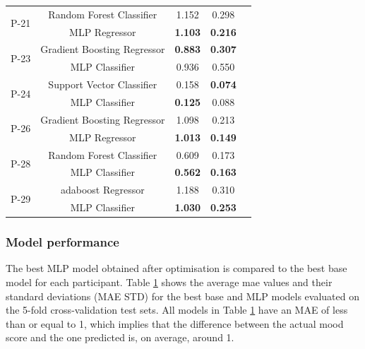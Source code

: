 \begin{table}[htbp]
\begin{tabular}{ccc c c}
 \multirow{2}{*}{P-21} 
 & Random Forest Classifier    & 1.152 & 0.298 \\
 & MLP Regressor               & \textbf{1.103} & \textbf{0.216} \\
 \hline

 \multirow{2}{*}{P-23} 
 & Gradient Boosting Regressor & \textbf{0.883} & \textbf{0.307} \\
 & MLP Classifier              & 0.936 & 0.550 \\
 \hline

 \multirow{2}{*}{P-24} 
 & Support Vector Classifier   & 0.158 & \textbf{0.074} \\
 & MLP Classifier              & \textbf{0.125} & 0.088 \\
 \hline

 \multirow{2}{*}{P-26} 
 & Gradient Boosting Regressor & 1.098 & 0.213 \\
 & MLP Regressor               & \textbf{1.013} & \textbf{0.149} \\
 \hline

 \multirow{2}{*}{P-28} 
 & Random Forest Classifier    & 0.609 & 0.173 \\
 & MLP Classifier              & \textbf{0.562} & \textbf{0.163} \\
 \hline

 \multirow{2}{*}{P-29} 
 &  \gls{adaboost} Regressor          & 1.188 & 0.310 \\
 & MLP Classifier              & \textbf{1.030} & \textbf{0.253} \\
 \hline
 \end{tabular}
 \label{tab:overall_res}
\end{table}



\subsubsection{Model performance}

The best MLP model obtained after optimisation is compared to the best base model for each participant. Table \ref{tab:overall_res} shows the average \gls{mae} values and their standard deviations (MAE STD) for the best base and MLP models evaluated on the 5-fold cross-validation test sets. All models in Table \ref{tab:overall_res} have an MAE of less than or equal to 1, which implies that the difference between the actual mood score and the one predicted is, on average, around 1. 

